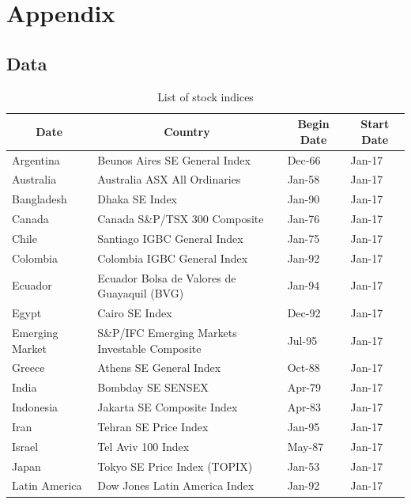 \documentclass[12pt,final,fleqn]{article}
\theoremstyle{plain}
\begin{document}
\section{Appendix} \label{sec: appendix}

\subsection{Data} \label{subsec: data}

\begin{table}[H]
\caption{List of stock indices} \label{tab:stock-list}
\vspace{-5pt}
\footnotesize
\begin{center}
\begin{threeparttable}
\begin{tabular*}{\textwidth}{l@{\extracolsep{\fill}}lll}
  \hline
  \hline
  \multicolumn{1}{c}{Date}&\multicolumn{1}{c}{Country}&\multicolumn{1}{c}{Begin Date} &\multicolumn{1}{c}{Start Date}\\
  \hline
Argentina & Beunos Aires SE General Index & Dec-66 & Jan-17\\
Australia & Australia ASX All Ordinaries & Jan-58 & Jan-17\\
Bangladesh & Dhaka SE Index & Jan-90 & Jan-17\\
Canada & Canada S\&P/TSX 300 Composite & Jan-76 & Jan-17\\
Chile & Santiago IGBC General Index & Jan-75 & Jan-17\\
Colombia & Colombia IGBC General Index & Jan-92 & Jan-17\\
Ecuador & Ecuador Bolsa de Valores de Guayaquil (BVG) & Jan-94 & Jan-17\\
Egypt & Cairo SE Index & Dec-92 & Jan-17\\
Emerging Market & S\&P/IFC Emerging Markets Investable Composite & Jul-95 & Jan-17\\
Greece & Athens SE General Index & Oct-88 & Jan-17\\
India & Bombday SE SENSEX & Apr-79 & Jan-17\\
Indonesia & Jakarta SE Composite Index & Apr-83 & Jan-17\\
Iran & Tehran SE Price Index & Jan-95 & Jan-17\\
Israel & Tel Aviv 100 Index & May-87 & Jan-17\\
Japan & Tokyo SE Price Index (TOPIX) & Jan-53 & Jan-17\\
Latin America & Dow Jones Latin America Index & Jan-92 & Jan-17\\

\end{tabular*}
\end{threeparttable}
\end{center}
\end{table}
\end{document}
